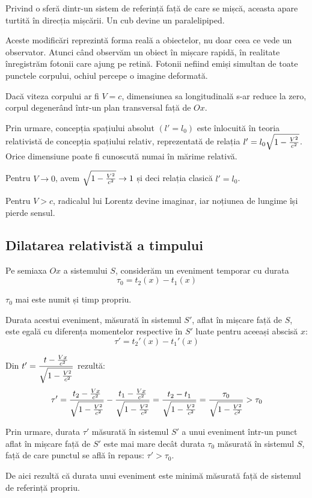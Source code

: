 Privind o sferă dintr-un sistem de referință față de care se mișcă, aceasta
apare turtită în direcția mișcării. Un cub devine un paralelipiped.

Aceste modificări reprezintă forma reală a obiectelor, nu doar ceea ce vede un
observator. Atunci când observăm un obiect în mișcare rapidă, în realitate
înregistrăm fotonii care ajung pe retină. Fotonii nefiind emiși
simultan de toate punctele corpului, ochiul percepe o imagine deformată.

Dacă viteza corpului ar fi \( V = c \), dimensiunea sa longitudinală s-ar reduce
la zero, corpul degenerând într-un plan transversal față de $Ox$.

Prin urmare, concepția spațiului absolut \( \left( l' = l_0 \right) \) este
înlocuită în teoria relativistă de concepția spațiului relativ, reprezentată
de relația \( l' = l_0 \sqrt{1 - \frac{V^2}{c^2}} \). Orice dimensiune poate fi cunoscută
numai în mărime relativă.

Pentru \( V \rightarrow 0 \), avem \( \sqrt{1 - \frac{V^2}{c^2}} \rightarrow 1 \) și deci
relația clasică \( l' = l_0 \).

Pentru \( V > c \), radicalul lui Lorentz devine imaginar, iar noțiunea de lungime
își pierde sensul.


\subsection{Dilatarea relativistă a timpului}
Pe semiaxa $Ox$ a sistemului $S$, considerăm un eveniment temporar cu durata
\[ \tau_0 = t_2(x) - t_1(x) \]

$\tau_0$ mai este numit și timp propriu.

Durata acestui eveniment, măsurată în sistemul $S'$, aflat în mișcare față de
$S$, este egală cu diferența momentelor respective în $S'$ luate pentru aceeași
abscisă $x$:
\[ \tau' = t_2'(x) - t_1'(x) \]

Din \( t' = \dfrac{t - \frac{Vx}{c^2}}{\sqrt{1 - \frac{V^2}{c^2}}} \) rezultă:
\[
    \tau'
    = \frac{t_2 - \frac{Vx}{c^2}}{\sqrt{1 - \frac{V^2}{c^2}}}
    - \frac{t_1 - \frac{Vx}{c^2}}{\sqrt{1 - \frac{V^2}{c^2}}}
    = \frac{t_2 - t_1}{\sqrt{1 - \frac{V^2}{c^2}}} = \frac{\tau_0}{\sqrt{1 - \frac{V^2}{c^2}}} > \tau_0
\]

Prin urmare, durata $\tau'$ măsurată în sistemul $S'$ a unui eveniment într-un
punct aflat în mișcare față de $S'$ este mai mare decât durata $\tau_0$
măsurată în sistemul $S$, față de care punctul se află în repaus:
\( \tau' > \tau_0 \).

De aici rezultă că durata unui eveniment este minimă măsurată față de sistemul
de referință propriu.

